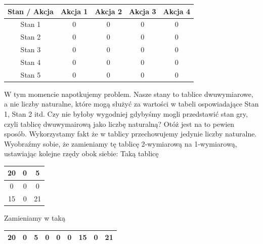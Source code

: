 \documentclass[a4paper,12pt]{article}
\begin{document}
\begin{center}
\begin{tabular}{ |c|c|c|c|c| }
\hline
Stan /  Akcja & Akcja 1 & Akcja 2 & Akcja 3 & Akcja 4 \\
\hline
Stan 1 & \small{0} & \small{0} & \small{0} & \small{0} \\
\hline
Stan 2 & \small{0} & \small{0} & \small{0} & \small{0} \\
\hline
Stan 3 & \small{0} & \small{0} & \small{0} & \small{0} \\
\hline
Stan 4 & \small{0} & \small{0} & \small{0} & \small{0} \\
\hline
Stan 5 & \small{0} & \small{0} & \small{0} & \small{0} \\
\hline 
\end{tabular}
\newline \newline
\end{center} 
 W tym momencie napotkujemy problem. Nasze stany to tablice dwuwymiarowe, a nie liczby naturalne, które mogą służyć za wartości w tabeli ospowiadające Stan 1, Stan 2 itd. Czy nie byłoby wygodniej gdybyśmy mogli przedstawić stan gry, czyli tablicę dwuwymairową jako liczbę naturalną? Otóż jest na to pewien sposób. Wykorzystamy fakt że w tablicy przechowujemy jedynie liczby naturalne. Wyobraźmy sobie, że zamieniamy tę tablicę 2-wymiarową na 1-wymiarową, ustawiając kolejne rzędy obok siebie:
\newline \newline Taką tablicę
\begin{center}
\begin{tabular}{ |c|c|c| }
\hline
20 & 0 & 5 \\
\hline
0 & 0 & 0 \\
\hline
15 & 0 & 21 \\
\hline
\end{tabular}
\end{center} 
Zamieniamy w taką
\begin{center}
\begin{tabular}{ |c|c|c|c|c|c|c|c|c| }
\hline
20 & 0 & 5 & 0 & 0 & 0 & 15 & 0 & 21 \\
\hline
\end{tabular}
\newline
\end{center} 
\end{document}
